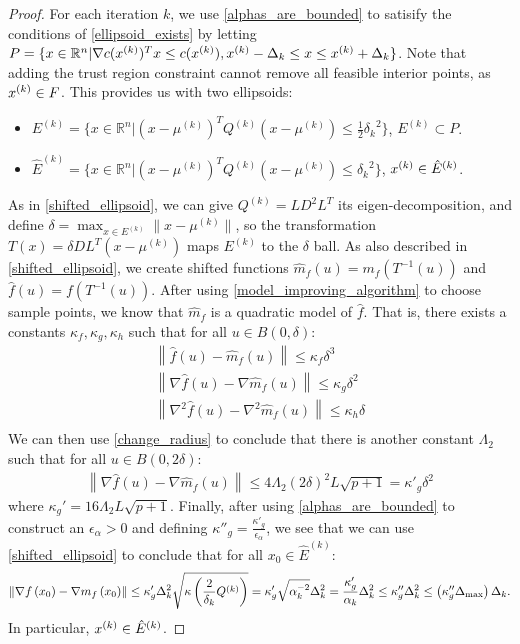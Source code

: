\begin{proof}
For each iteration $k$, we use \cref{alphas_are_bounded} to satisify the conditions of \cref{ellipsoid_exists} by letting 
$P = \{x \in \mathbb R^n |  \nabla c({x^{(k)}})^T x \le c({x^{(k)}}), {x^{(k)}} - \Delta_k \le x \le {x^{(k)}} + \Delta_k \}$.
Note that adding the trust region constraint cannot remove all feasible interior points, as ${x^{(k)}} \in {F}$.
This provides us with two ellipsoids:
\begin{itemize}
\item $E^{(k)} = \{x \in \mathbb R^n | \left(x - \mu^{(k)}\right)^T Q^{(k)} \left(x - \mu^{(k)}\right) \le \frac 1 2 {\delta_k}^2 \}$, $E^{(k)} \subset P$.
\item $\hat E^{(k)} = \{x \in \mathbb R^n | \left(x - \mu^{(k)}\right)^T Q^{(k)} \left(x - \mu^{(k)}\right) \le {\delta_k}^2 \}$, ${x^{(k)}} \in \hat E^{(k)}$.
\end{itemize}
As in \cref{shifted_ellipsoid}, we can give $Q^{(k)} = LD^2L^T$ its eigen-decomposition, and define $\delta = \max_{x \in E^{(k)}} \|x - \mu^{(k)}\|$, 
so the transformation $T(x) = \delta D L^T(x - \mu^{(k)})$ maps $E^{(k)}$ to the $\delta$ ball.
As also described in \cref{shifted_ellipsoid}, we  create shifted functions
$\hat {m}_f(u) = m_f(T^{-1}(u))$ and
$\hat f (u) = f(T^{-1}(u))$.
After using \cref{model_improving_algorithm} to choose sample points, we know that ${\hat m }_f$ is a quadratic model of $\hat f$.
That is, there exists a constants $\kappa_f, \kappa_g, \kappa_h$ such that for all $u \in B(0, \delta)$:
\begin{align*}
\left\| \hat {f}\left(u\right) -  \hat{m}_f\left(u\right) \right\|\le \kappa_f \delta^3 \\
\left\|\nabla \hat {f}\left(u\right) - \nabla \hat{m}_f\left(u\right) \right\|\le \kappa_g \delta^2 \\
\left\|\nabla^2 \hat {f}\left(u\right) - \nabla^2 \hat{m}_f\left(u\right) \right\|\le \kappa_h \delta \\
\end{align*}
We can then use \cref{change_radius} to conclude that there is another constant $\Lambda_2$ such that for all $u \in B(0, 2\delta)$:
\begin{align*}
\left\|\nabla \hat {f}\left(u\right) - \nabla \hat{m}_f\left(u\right) \right\|\le 4 \Lambda_2 \left(2\delta\right)^2 L \sqrt{p+1} = {\kappa'}_g\delta^2
\end{align*}
where $\kappa_{g}' = 16 \Lambda_2 L \sqrt{p+1}$.
Finally, after using  \cref{alphas_are_bounded} to construct an $\epsilon_{\alpha} > 0$ and defining $\kappa''_{g} =  \frac{\kappa'_g}{\epsilon_{\alpha}}$, we see that
we can use  \cref{shifted_ellipsoid} to conclude that for all $x_0 \in \hat E^{(k)}$:
\begin{align*}
\left\|\nabla f\left(x_0 \right) - \nabla m_f\left(x_0\right)\right\| \le 
\kappa'_g  \Delta_k^2 \sqrt{\kappa\left(\frac 2 {\delta_k} Q^{(k)}\right)}=  \kappa'_g \sqrt{\alpha_k^{-2}}\Delta_k^2 = \frac{\kappa'_g}{\alpha_k} \Delta_k^2\le \kappa''_g\Delta_k^2 \le \left(\kappa''_g \Delta_{\text{max}}\right) \Delta_k.
\end{align*}
In particular, ${x^{(k)}} \in \hat E^{(k)}$.
\end{proof}


